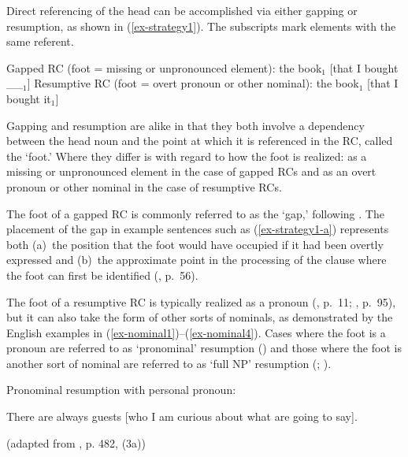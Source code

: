 \noindent Direct referencing of the head can be accomplished via either gapping or resumption, as shown in (\ref{ex-strategy1}). The subscripts mark elements with the same referent.

\pex\label{ex-strategy1}
\a Gapped RC (foot = missing or unpronounced element):\vspace{5pt}\newline\nobreak
the book$_1$ [that I bought \_\_$_1$] \label{ex-strategy1-a}
\a Resumptive RC (foot = overt pronoun or other nominal):\vspace{5pt}\newline\nobreak 
\ljudge*the book$_1$ [that I bought it$_1$] \label{ex-strategy1-b}
\xe

\noindent Gapping and resumption are alike in that they both involve a dependency between the head noun and the point at which it is referenced in the RC, called the `foot.' Where they differ is with regard to how the foot is realized: as a missing or unpronounced element in the case of gapped RCs and as an overt pronoun or other nominal in the case of resumptive RCs.

The foot of a gapped RC is commonly referred to as the `gap,' following \textcite{fodor1978}. The placement of the gap in example sentences such as (\ref{ex-strategy1-a}) represents both (a)~the position that the foot would have occupied if it had been overtly expressed and (b)~the approximate point in the processing of the clause where the foot can first be identified (\cite{ogrady2022a}, p.~56).

The foot of a resumptive RC is typically realized as a pronoun (\cite{aoun.choueiri2000}, p.~11; \cite{radford2019}, p.~95), but it can also take the form of other sorts of nominals, as demonstrated by the English examples in (\ref{ex-nominal1})--(\ref{ex-nominal4}). Cases where the foot is a pronoun are referred to as `pronominal' resumption (\cite{asudeh2012,kroch1981,prince1990,radford2019}) and those where the foot is another sort of nominal are referred to as `full NP' resumption (\cite{gavarro.hu2013}; \cite{prince1990}).

\ex
Pronominal resumption with personal pronoun: \par\nobreak\vspace{5pt}
There are always guests [who I am curious about what  are going to say]. \par\nobreak\vspace{5pt} 
\hfill (adapted from \cite{prince1990}, p. 482, (3a))\label{ex-nominal1}
\xe

